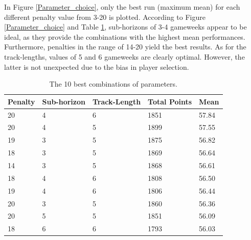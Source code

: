 In Figure \ref{Parameter_choice}, only the best run (maximum mean) for each different penalty value from 3-20 is plotted. According to Figure \ref{Parameter_choice} and Table \ref{tab:top_10}, sub-horizons of 3-4 gameweeks appear to be ideal, as they provide the combinations with the highest mean performances. Furthermore, penalties in the range of 14-20 yield the best results. As for the track-lengths, values of 5 and 6 gameweeks are clearly optimal. However, the latter is not unexpected due to the bias in player selection. 

\begin{table}[H]
\centering
\begin{tabular}{|l|l|l|l|l|}
\hline
Penalty & Sub-horizon & Track-Length & Total Points & Mean  \\
\hline
20      & 4       & 6                & 1851         & 57.84 \\
20      & 4       & 5                & 1899         & 57.55 \\
19      & 3       & 5                & 1875         & 56.82 \\
18      & 3       & 5                & 1869         & 56.64 \\
14      & 3       & 5                & 1868         & 56.61 \\
18      & 4       & 6                & 1808         & 56.50 \\
19      & 4       & 6                & 1806         & 56.44 \\
20      & 3       & 5                & 1860         & 56.36 \\
20      & 5       & 5                & 1851         & 56.09 \\
18      & 6       & 6                & 1793         & 56.03 \\
\hline
\end{tabular}
\caption{The 10 best combinations of parameters.}
\label{tab:top_10}
\end{table}



